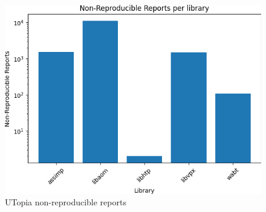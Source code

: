 \documentclass[a4paper,11pt,oneside]{report}
\begin{document}
\begin{figure}[h]
	\centering
	\includegraphics[width=12cm]{figures/non_reproducible_crashes.png}
	\caption{UTopia non-reproducible reports}
	\label{fig:utopia_non_rep}
\end{figure}
\end{document}
